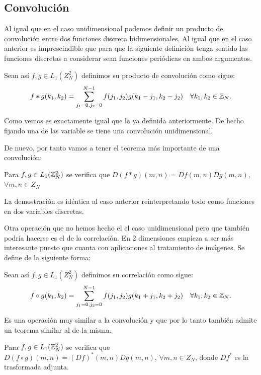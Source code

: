 \documentclass{article}
\begin{document}
\subsection{Convolución}
Al igual que en el caso unidimensional podemos definir un producto de convolución entre dos funciones discreta bidimensionales. Al igual que en el caso anterior es imprescindible que para que la siguiente definición tenga sentido las funciones discretas a considerar sean funciones periódicas en ambos argumentos. 

\begin{definition}
Sean así $f,g \in L_1(Z_{N}^{2})$ definimos su producto de convolución como sigue:
\[
f \ast g(k_1,k_2)=\sum_{j_1=0,j_2=0}^{N-1}f(j_1,j_2)g(k_1-j_1,k_2-j_2) \quad \forall k_1,k_2 \in \mathbb{Z}_N.
\]
\end{definition}

Como vemos es exactamente igual que la ya definida anteriormente. De hecho fijando una de las variable se tiene una convolución unidimensional.

De nuevo, por tanto vamos a tener el teorema más importante de una convolución:

\begin{theorem}
  Para $f,g \in L_1(\mathbb{Z}_{N}^{2})$ se verifica que $D(f \ast g)(m,n)=Df(m,n)Dg(m,n)$, $\forall m,n \in Z_N$
\end{theorem}

La demostración es idéntica al caso anterior reinterpretando todo como funciones en dos variables discretas.

Otra operación que no hemos hecho el el caso unidimensional pero que también podría hacerse es el de la correlación. En 2 dimensiones empieza a ser más interesante puesto que cuanta con aplicaciones al tratamiento de imágenes. Se define de la siguiente forma:

\begin{definition}
Sean así $f,g \in L_1(Z_{N}^{2})$ definimos su correlación como sigue:
\[
f \circ g(k_1,k_2)=\sum_{j_1=0,j_2=0}^{N-1}f(j_1,j_2)g(k_1+j_1,k_2+j_2) \quad \forall k_1,k_2 \in \mathbb{Z}_N.
\]
\end{definition}

Es una operación muy similar a la convolución y que por lo tanto también admite un teorema similar al de la misma.

\begin{theorem}
  Para $f,g \in L_1(\mathbb{Z}_{N}^{2})$ se verifica que $D(f \circ g)(m,n)=(Df)^*(m,n)Dg(m,n)$, $\forall m,n \in Z_N$, donde $Df^*$ es la trasformada adjunta.
\end{theorem}
\end{document}
